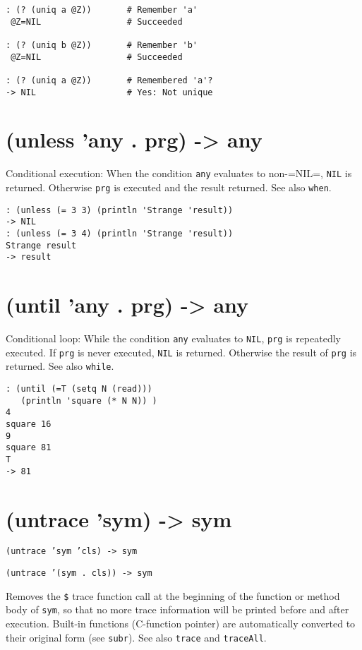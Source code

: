 {{{{{{{{\begin{verbatim}
: (? (uniq a @Z))       # Remember 'a'
 @Z=NIL                 # Succeeded

: (? (uniq b @Z))       # Remember 'b'
 @Z=NIL                 # Succeeded

: (? (uniq a @Z))       # Remembered 'a'?
-> NIL                  # Yes: Not unique
\end{verbatim}

 
\section{(unless 'any . prg) -> any}
\label{sec-8-1-21-11}


Conditional execution: When the condition \texttt{any} evaluates to non-=NIL=,
\texttt{NIL} is returned. Otherwise \texttt{prg} is executed and the result returned.
See also \texttt{when}.


\begin{verbatim}
: (unless (= 3 3) (println 'Strange 'result))
-> NIL
: (unless (= 3 4) (println 'Strange 'result))
Strange result
-> result
\end{verbatim}

 
\section{(until 'any . prg) -> any}
\label{sec-8-1-21-12}


Conditional loop: While the condition \texttt{any} evaluates to \texttt{NIL}, \texttt{prg} is
repeatedly executed. If \texttt{prg} is never executed, \texttt{NIL} is returned.
Otherwise the result of \texttt{prg} is returned. See also \texttt{while}.


\begin{verbatim}
: (until (=T (setq N (read)))
   (println 'square (* N N)) )
4
square 16
9
square 81
T
-> 81
\end{verbatim}

 
\section{(untrace 'sym) -> sym}
\label{sec-8-1-21-13}


\texttt{(untrace 'sym 'cls) -> sym}

\texttt{(untrace '(sym . cls)) -> sym}

Removes the \texttt{\$} trace function call at the beginning of the function or
method body of \texttt{sym}, so that no more trace information will be printed
before and after execution. Built-in functions (C-function pointer) are
automatically converted to their original form (see \texttt{subr}). See also
\texttt{trace} and \texttt{traceAll}.


}}}}}}}}
